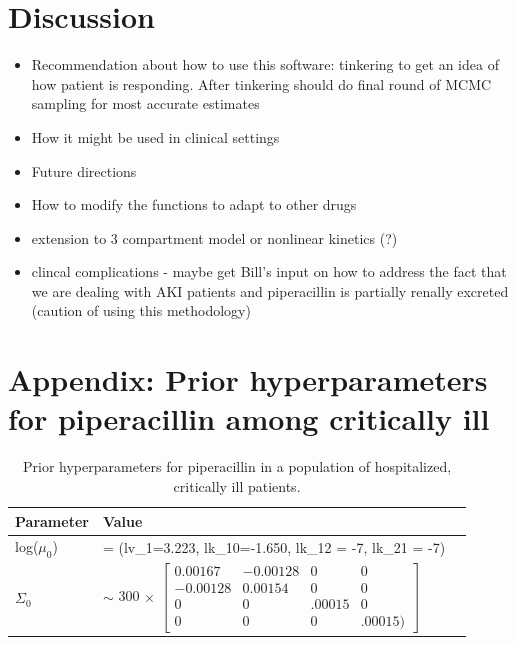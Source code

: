 \documentclass{article}\usepackage[]{graphicx}\usepackage[]{color}
\begin{document}



\section{Discussion}

\begin{itemize}

  \item Recommendation about how to use this software: tinkering to get an idea of how patient is responding. After tinkering should do final round of MCMC sampling for most accurate estimates
  \item How it might be used in clinical settings
  \item Future directions
  \item How to modify the functions to adapt to other drugs
  \item extension to 3 compartment model or nonlinear kinetics (?)
  \item clincal complications - maybe get Bill's input on how to address the fact that we are dealing with AKI patients and piperacillin is partially renally excreted (caution of using this methodology)

\end{itemize}



\section{Appendix: Prior hyperparameters for piperacillin among critically ill}
\begin{center}
\begin{table}
\begin{tabular}{lll} \hline
Parameter & Value \\ \hline
log($\mu_0$) & = (lv_1=3.223, lk_10=-1.650, lk_12 = -7, lk_21 = -7)\\
$\Sigma_0$ & $\sim$ 300 $\times$ $\begin{bmatrix} 0.00167 & -0.00128 & 0 & 0\\
                                -0.00128 & 0.00154 &      0 &      0 \\
                                       0 &       0 & .00015 &      0 \\
                                       0 &       0 &      0 & .00015)\end{bmatrix}$ \\ %
\hline
\end{tabular}
\caption{Prior hyperparameters for piperacillin in a population of hospitalized, critically ill patients.}\label{tab:hyp}
\end{table}
\end{center}
\end{document}
